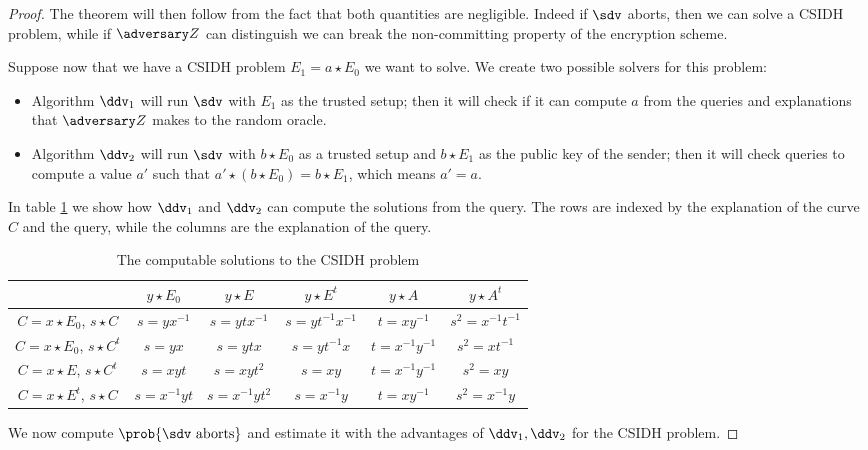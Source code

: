 \begin{proof}
    The theorem will then follow from the fact that both quantities are negligible. Indeed if $\sdv$ aborts, then we can solve a CSIDH problem, while if $\zdv$ can distinguish we can break the non-committing property of the encryption scheme.
    
    Suppose now that we have a CSIDH problem $E_1=a\star E_0$ we want to solve. We create two possible solvers for this problem:
    \begin{itemize}
        \item Algorithm $\ddv_1$ will run $\sdv$ with $E_1$ as the trusted setup; then it will check if it can compute $a$ from the queries and explanations that $\zdv$ makes to the random oracle.
        \item Algorithm $\ddv_2$ will run $\sdv$ with $b\star E_0$ as a trusted setup and $b\star E_1$ as the public key of the sender; then it will check queries to compute a value $a'$ such that $a'\star(b\star E_0)=b\star E_1$, which means $a'=a$.
    \end{itemize}
    
    In table \ref{tab_dlogs} we show how $\ddv_1$ and $\ddv_2$ can compute the solutions from the query. The rows are indexed by the explanation of the curve $C$ and the query, while the columns are the explanation of the query.
    
    \begin{table}[]
        \centering
        \begin{tabular}{c|ccccc}
            & $y\star E_0$ & $y\star E$ & $y\star E^t$ & $y\star A$ & $y\star A^t$ \\
            \hline
            $C=x\star E_0$, $s\star C$ & $s=yx^{-1}$ & $s=ytx^{-1}$ & $s=yt^{-1}x^{-1}$ & $t=xy^{-1}$ & $s^2=x^{-1}t^{-1}$ \\ 
            $C=x\star E_0$, $s\star C^t$ & $s=yx$ & $s=ytx$ & $s=yt^{-1}x$ & $t=x^{-1}y^{-1}$ & $s^2=xt^{-1}$ \\
            $C=x\star E$, $s\star C^t$ & $s=xyt$ & $s=xyt^2$ & $s=xy$ & $t=x^{-1}y^{-1}$ & $s^2=xy$ \\
            $C=x\star E^t$, $s\star C$ & $s=x^{-1}yt$ & $s=x^{-1}yt^2$ & $s=x^{-1}y$ & $t=xy^{-1}$ & $s^2=x^{-1}y$ \\
        \end{tabular}
        \caption{The computable solutions to the CSIDH problem}
        \label{tab_dlogs}
    \end{table}
    
    We now compute $\prob{\sdv\text{ aborts}}$ and estimate it with the advantages of $\ddv_1,\ddv_2$ for the CSIDH problem.
    

\end{proof}
